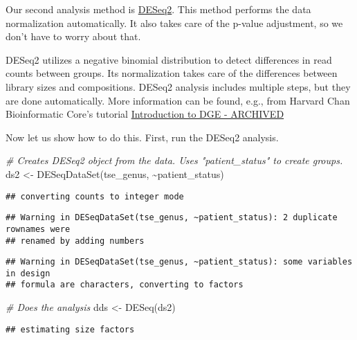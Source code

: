 \documentclass[
  oneside]{book}
\newenvironment{Shaded}{\begin{snugshade}}{\end{snugshade}}
\newcommand{\CommentTok}[1]{\textcolor[rgb]{0.56,0.35,0.01}{\textit{#1}}}
\newcommand{\FunctionTok}[1]{\textcolor[rgb]{0.00,0.00,0.00}{#1}}
\newcommand{\NormalTok}[1]{#1}
\newcommand{\OtherTok}[1]{\textcolor[rgb]{0.56,0.35,0.01}{#1}}
\newcommand{\SpecialCharTok}[1]{\textcolor[rgb]{0.00,0.00,0.00}{#1}}
\begin{document}
Our second analysis method is \href{https://genomebiology.biomedcentral.com/articles/10.1186/s13059-014-0550-8}{DESeq2}. This method performs the data
normalization automatically. It also takes care of the p-value
adjustment, so we don't have to worry about that.

DESeq2 utilizes a negative binomial distribution to detect differences in
read counts between groups. Its normalization takes care of the
differences between library sizes and compositions. DESeq2 analysis
includes multiple steps, but they are done automatically. More
information can be found, e.g., from Harvard Chan Bioinformatic Core's
tutorial \href{https://hbctraining.github.io/DGE_workshop/lessons/04_DGE_DESeq2_analysis.html}{Introduction to DGE -
ARCHIVED}

Now let us show how to do this. First, run the DESeq2 analysis.

\begin{Shaded}
\begin{Highlighting}[]
\CommentTok{\# Creates DESeq2 object from the data. Uses "patient\_status" to create groups. }
\NormalTok{ds2 }\OtherTok{\textless{}{-}} \FunctionTok{DESeqDataSet}\NormalTok{(tse\_genus, }\SpecialCharTok{\textasciitilde{}}\NormalTok{patient\_status)}
\end{Highlighting}
\end{Shaded}

\begin{verbatim}
## converting counts to integer mode
\end{verbatim}

\begin{verbatim}
## Warning in DESeqDataSet(tse_genus, ~patient_status): 2 duplicate rownames were
## renamed by adding numbers
\end{verbatim}

\begin{verbatim}
## Warning in DESeqDataSet(tse_genus, ~patient_status): some variables in design
## formula are characters, converting to factors
\end{verbatim}

\begin{Shaded}
\begin{Highlighting}[]
\CommentTok{\# Does the analysis}
\NormalTok{dds }\OtherTok{\textless{}{-}} \FunctionTok{DESeq}\NormalTok{(ds2)}
\end{Highlighting}
\end{Shaded}

\begin{verbatim}
## estimating size factors
\end{verbatim}
\end{document}
